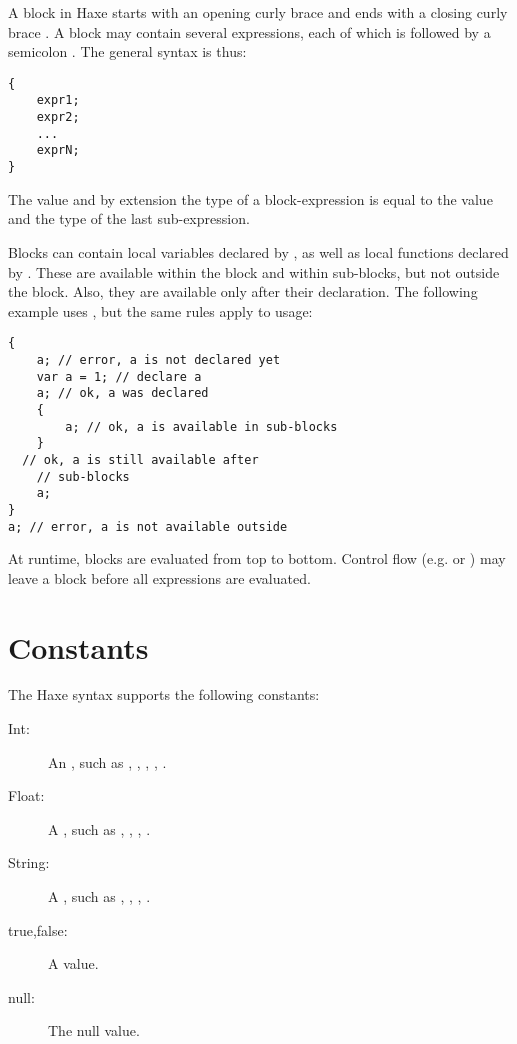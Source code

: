 A block in Haxe starts with an opening curly brace \expr{\{} and ends with a closing curly brace \expr{\}}. A block may contain several expressions, each of which is followed by a semicolon \expr{;}. The general syntax is thus:

\begin{lstlisting}
{
	expr1;
	expr2;
	...
	exprN;
}
\end{lstlisting}
The value and by extension the type of a block-expression is equal to the value and the type of the last sub-expression.

Blocks can contain local variables declared by , as well as local functions declared by . These are available within the block and within sub-blocks, but not outside the block. Also, they are available only after their declaration. The following example uses , but the same rules apply to  usage:

\begin{lstlisting}
{
	a; // error, a is not declared yet
	var a = 1; // declare a
	a; // ok, a was declared
	{
		a; // ok, a is available in sub-blocks
	}
  // ok, a is still available after
	// sub-blocks	
	a;
}
a; // error, a is not available outside
\end{lstlisting}
At runtime, blocks are evaluated from top to bottom. Control flow (e.g.  or ) may leave a block before all expressions
are evaluated.


\section{Constants}
\label{expression-constants}

The Haxe syntax supports the following constants:

\begin{description}
	\item[Int:] An , such as , , , , .
	\item[Float:] A , such as , , , .
	\item[String:] A , such as , , , .
	\item[true,false:] A  value.
	\item[null:] The null value.
\end{description}

